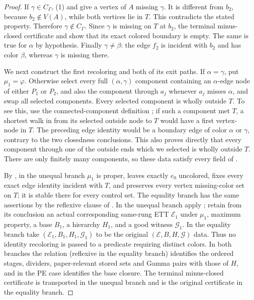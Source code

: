 \begin{proof}
If $\gamma\in C_\Gamma$, (1) and
 give a vertex of $A$ missing
$\gamma$.  It is different from $b_2$, because $b_2\notin V(A)$, while
both vertices lie in $T$.  This contradicts the stated
 property.  Therefore
$\gamma\notin C_\Gamma$.  Since $\gamma$ is missing on $T$ at $b_2$,
the terminal minus-closed certificate and
 show that its exact colored boundary is
empty.  The same is true for $\alpha$ by hypothesis.  Finally
$\gamma\ne\beta$: the edge $f_2$ is incident with $b_2$ and has color
$\beta$, whereas $\gamma$ is missing there.

We next construct the first recoloring and both of its exit paths.  If
$\alpha=\gamma$, put $\mu_1=\varphi$.  Otherwise select every full
$(\alpha,\gamma)$ component containing an $\alpha$-edge node of either
$P_1$ or $P_2$, and also the component through $a_j$ whenever $a_j$
misses $\alpha$, and swap all selected components.  Every selected
component is wholly outside $T$.  To see this, use the connected-component
definition ; if such a component met $T$, a
shortest walk in  from its selected
outside node to $T$ would have a first vertex-node in $T$.  The preceding
edge identity would be a boundary edge of color $\alpha$ or $\gamma$,
contrary to the two closedness conclusions.  This also proves directly
that every component through one of the outside ends which we selected is
wholly outside $T$.  There are only finitely many components, so these
data satisfy every field of .

By , in the unequal branch
$\mu_1$ is proper, leaves exactly $e_0$ uncolored, fixes every exact edge
identity incident with $T$, and preserves every vertex missing-color set
on $T$; it is stable there for every control set.  The equality branch
has the same assertions by the reflexive clause of .
In the unequal branch apply ; retain from its
conclusion an actual corresponding same-rung ETT $\mathcal E_1$ under
$\mu_1$, maximum property, a base $B_1$, a hierarchy $H_1$, and a good
witness $\mathcal G_1$.  In the equality branch take
$(\mathcal E_1,B_1,H_1,\mathcal G_1)$ to be the original
$(\mathcal E,B,H,\mathcal G)$ data.  Thus no identity recoloring is
passed to a predicate requiring distinct colors.  In both branches the
relation  (reflexive in the equality branch)
identifies the ordered stages, dividers, paper-relevant stored sets and
Gamma pairs with those of $H$, and in the PE case identifies the base
closure.  The terminal minus-closed certificate is transported in the
unequal branch and is the original certificate in the equality branch.


\end{proof}

